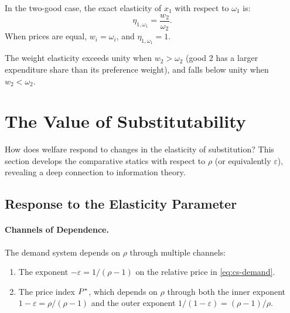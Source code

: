 \begin{proposition}
\label{prop:weight-elasticity}
In the two-good case, the exact elasticity of $x_1$ with respect to $\omega_1$ is:
\begin{equation}
\eta_{1,\omega_1} = \frac{w_2}{\omega_2}.
\end{equation}
When prices are equal, $w_i = \omega_i$, and $\eta_{1,\omega_1} = 1$.
\end{proposition}

The weight elasticity exceeds unity when $w_2 > \omega_2$ (good 2 has a larger expenditure share than its preference weight), and falls below unity when $w_2 < \omega_2$.

\section{The Value of Substitutability}
\label{sec:value-substitutability}

How does welfare respond to changes in the elasticity of substitution? This section develops the comparative statics with respect to $\rho$ (or equivalently $\varepsilon$), revealing a deep connection to information theory.

\subsection{Response to the Elasticity Parameter}
\label{subsec:rho-response}

\paragraph{Channels of Dependence.}

The demand system depends on $\rho$ through multiple channels:
\begin{enumerate}[label=(\roman*), nosep]
    \item The exponent $-\varepsilon = 1/(\rho - 1)$ on the relative price in \eqref{eq:cs-demand}.
    \item The price index $P^{*}$, which depends on $\rho$ through both the inner exponent $1 - \varepsilon = \rho/(\rho-1)$ and the outer exponent $1/(1-\varepsilon) = (\rho-1)/\rho$.
\end{enumerate}

